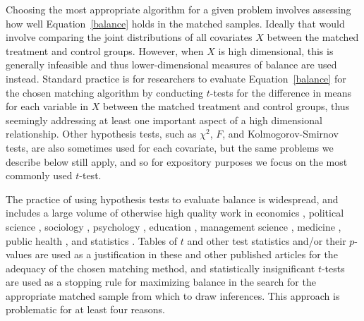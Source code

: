 \documentclass[11pt,titlepage]{article}
\begin{document}
Choosing the most appropriate algorithm for a given problem involves
assessing how well Equation~\ref{balance} holds in the matched
samples.  Ideally that would involve comparing the joint distributions
of all covariates $X$ between the matched treatment and control
groups.  However, when $X$ is high dimensional, this is generally
infeasible and thus lower-dimensional measures of balance are used
instead.  Standard practice is for researchers to evaluate
Equation~\ref{balance} for the chosen matching algorithm by
conducting $t$-tests for the difference in means for each variable in
$X$ between the matched treatment and control groups, thus seemingly
addressing at least one important aspect of a high dimensional
relationship.  Other hypothesis tests, such as $\chi^2$, $F$, and
Kolmogorov-Smirnov tests, are also sometimes used for each covariate,
but the same problems we describe below still apply, and so for
expository purposes we focus on the most commonly used $t$-test.

The practice of using hypothesis tests to evaluate balance is
widespread, and includes a large volume of otherwise high quality work
in economics \citep{LisMilFre03,BlaSmi04,AgoDyn04,DehWah99,
  DehWah02,SmiTod05}, political science \citep{Imai05,SimHop05},
sociology \citep{LunSmi05}, psychology
\citep{HavNag05,HilWalBro05,YosMagBos03,JonDAgGon04,McCRidMor04},
education \citep{Crosnoe05,SchBuc03}, management science
\citep{FreMil04, Villalonga04,WanSchAvo05}, medicine
\citep{WanSchAvo05, MacRivJur06,LinPekWan05,ManTudDie06, PetRoeMul06,
  ShiLitPot06,SabCanGib05,PerTuUnd00,AusMam06,AusMamStu05}, public
health \citep{NovReaRau06,ElBGilWu05,LauSmiSta00,BinBreEar05}, and
statistics \citep{LuZanHor01}.  Tables of $t$ and other test
statistics and/or their $p$-values are used as a justification in
these and other published articles for the adequacy of the chosen
matching method, and statistically insignificant $t$-tests are used as
a stopping rule for maximizing balance in the search for the
appropriate matched sample from which to draw inferences.  This
approach is problematic for at least four reasons.
\end{document}
